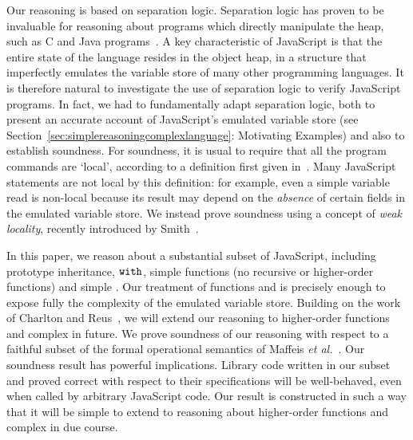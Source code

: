 \documentclass{article}
\begin{document}
Our reasoning is based on separation logic.  Separation logic has proven to be invaluable for reasoning about programs which directly manipulate the heap, such as C and Java programs~\cite{DBLP:conf/csl/OHearnRY01,conf/fmco/BerdineCO05,spacep,slayerp,1449782}.  A key characteristic of JavaScript is that the entire state of the language resides in the object heap, in a structure that imperfectly emulates the variable store of many other programming languages.  It is therefore natural to investigate the use of separation logic to verify JavaScript programs. In fact, we had to fundamentally adapt  separation logic, both to present an accurate account of JavaScript's emulated variable store (see  Section~\ref{sec:simplereasoningcomplexlanguage}: Motivating Examples) %
 and also to establish soundness.
%
For soundness,  it is usual to require that all the program commands are `local', according to  a definition first given
in~\cite{DBLP:conf/csl/OHearnRY01}. Many JavaScript statements are not local
by this definition: for example, even a simple variable read is non-local because its result 
may depend on the \emph{absence} of certain fields in the emulated variable store.
We instead  prove soundness using a concept of \emph{weak locality}, recently 
introduced by Smith~\cite{gdsThesis}. 


In this paper, we reason about a substantial subset  of JavaScript, including prototype inheritance, $\mbox{\texttt{{\upshape with}}}$, simple functions
(no recursive or higher-order functions) and simple . Our treatment of functions and   is precisely enough to 
expose fully the complexity of the emulated variable store. Building on the work of Charlton and Reus~\cite{billiejoe,Schwinghammer09nestedhoare}, we will extend our reasoning 
to  higher-order functions and complex  in future.
We prove soundness  of our reasoning with respect to a faithful subset of the formal operational semantics of Maffeis \emph{et al.}~\cite{MMT-APLAS-TR08}. Our soundness result has powerful implications. 
%
Library code 
written in our subset and proved correct with respect to their  specifications will be well-behaved,
even when called by arbitrary JavaScript code. Our  result is constructed in such a way  that it will be  simple to extend 
to reasoning  about higher-order functions and complex  in due course. 




\end{document}
